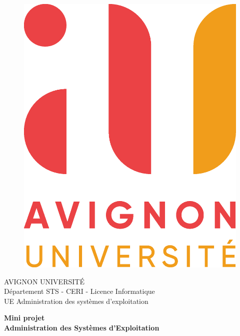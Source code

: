 \documentclass[a4paper, twoside]{report}
\begin{document}


\begin{titlepage}
\begin{figure}[!htb]
    \centering
    \includegraphics[keepaspectratio=true,scale=0.25]{./au.eps}
\end{figure}

\begin{center}
    \LARGE{AVIGNON UNIVERSITÉ}
    \vspace{5mm}
    \\ \large{Département STS - CERI - Licence Informatique}
    \vspace{5mm}
    \\ \LARGE{UE Administration des systèmes d'exploitation}
\end{center}

\vspace{15mm}
\begin{center}
    {\LARGE{\bf Mini projet\\\vspace{5mm} Administration des Systèmes d’Exploitation}}
\end{center}
\vspace{30mm}


\end{titlepage}
\end{document}
